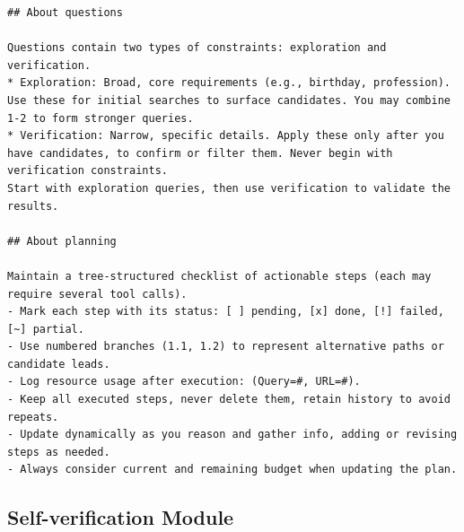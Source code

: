 \begin{center} %
\begin{tcolorbox}[
  enhanced,
  breakable,                 %
  colback=white,
  colframe=black!50!white,
  title={Budget-aware Planning Module in BATS},
  width=1.0\linewidth        %
]
\lstset{style=boxedcode}
\begin{lstlisting}
## About questions

Questions contain two types of constraints: exploration and verification. 
* Exploration: Broad, core requirements (e.g., birthday, profession). Use these for initial searches to surface candidates. You may combine 1-2 to form stronger queries.
* Verification: Narrow, specific details. Apply these only after you have candidates, to confirm or filter them. Never begin with verification constraints.
Start with exploration queries, then use verification to validate the results.

## About planning

Maintain a tree-structured checklist of actionable steps (each may require several tool calls).
- Mark each step with its status: [ ] pending, [x] done, [!] failed, [~] partial.
- Use numbered branches (1.1, 1.2) to represent alternative paths or candidate leads.
- Log resource usage after execution: (Query=#, URL=#).
- Keep all executed steps, never delete them, retain history to avoid repeats.
- Update dynamically as you reason and gather info, adding or revising steps as needed.
- Always consider current and remaining budget when updating the plan.
\end{lstlisting}
\end{tcolorbox}
\captionsetup{justification=centering} %
\label{fig:prompt_plan}
\end{center}


\subsection{Self-verification Module}\label{app:prompt_verification}

